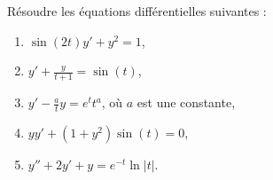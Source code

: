 

\begin{exercice}\label{exo_II-1-05}

Résoudre les équations différentielles suivantes :
\begin{enumerate}
\item $ \sin(2t)y'+y^2=1$,
\item $y'+\frac{ y }{ t+1 }=\sin(t)$,
\item $y'-\frac{ a }{ t }y=e^tt^a$, où $a$ est une constante,
\item $yy'+(1+y^2)\sin(t)=0$,
\item $y''+2y'+y= e^{-t}\ln| t |$.
\end{enumerate}

\end{exercice}
